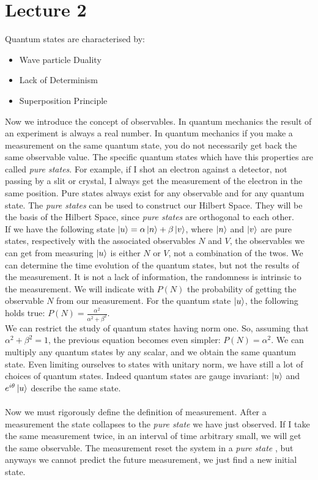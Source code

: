 \documentclass{article}
\begin{document}
\section{Lecture 2}

Quantum states are characterised by:
\begin{itemize}
    \item Wave particle Duality
    \item  Lack of Determinism
    \item Superposition Principle
\end{itemize}
Now we introduce the concept of observables. In quantum mechanics the result of an experiment is always a real number. In quantum mechanics if you make a measurement on the same quantum state, you do not necessarily get back the same observable value. The specific quantum states which have this properties are called \emph{pure states}.
For example, if I shot an electron against a detector, not passing by a slit or crystal, I always get the measurement of the electron in the same position. Pure states always exist for any observable and for any quantum state. The \emph{pure states} can be used to construct our Hilbert Space. They will be the basis of the Hilbert Space, since \emph{pure states} are orthogonal to each other. \\
If we have the following state $\ket{u} = \alpha \ket{n} + \beta \ket{v}$, where $\ket{n}$ and $\ket{v}$ are pure states, respectively with the associated observables $N$ and $V$, the observables we can get from measuring $\ket{u}$ is either $N$ or $V$, not a combination of the twos. We can determine the time evolution of the quantum states, but not the results of the measurement. It is not a lack of information, the randomness is intrinsic to the measurement.
We will indicate with $P(N)$ the probability of getting the observable $N$ from our measurement.
For the quantum state $\ket{u}$, the following holds true:  $P(N) = \frac{\alpha^2}{\alpha^2+\beta^2}$.\\
We can restrict the study of quantum states having norm one. So, assuming that $\alpha^2 + \beta^2 = 1 $, the previous equation becomes even simpler: $P(N) = \alpha^2$.
We can multiply any quantum states by any scalar, and we obtain the same quantum state.  Even limiting ourselves to states with unitary norm, we have still a lot of choices of quantum states. 
Indeed quantum states are gauge invariant: $\ket{u} $ and $ e^{i\theta} \ket{u}$ describe the same state.\\ \\
Now we must rigorously define the definition of measurement. After a measurement the state collapses to the \emph{pure state} we have just observed. If I take the same measurement twice, in an interval of time arbitrary small, we will get the same observable.
The measurement reset the system in a \emph{pure state} , but anyways we cannot predict the future measurement, we just find a new initial state.
\end{document}
